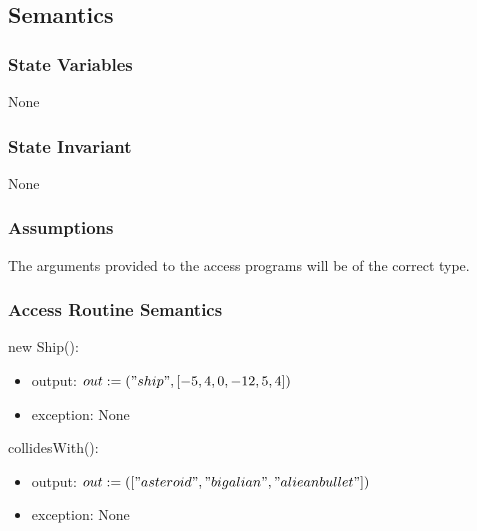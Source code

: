 \documentclass[12pt]{article}
\begin{document}
\subsection* {Semantics}

\subsubsection* {State Variables}
None


\subsubsection* {State Invariant}
None

\subsubsection* {Assumptions}

The arguments provided to the access programs will be of the correct type.

\subsubsection* {Access Routine Semantics}

\noindent new Ship():
\begin{itemize}
\item output: $out := ("ship",[-5,4,0,-12,5,4])$
\item exception: None
\end{itemize}

\noindent collidesWith():
\begin{itemize}
\item output: $out := (["asteroid","bigalian","alieanbullet"])$
\item exception: None
\end{itemize}
\end{document}
